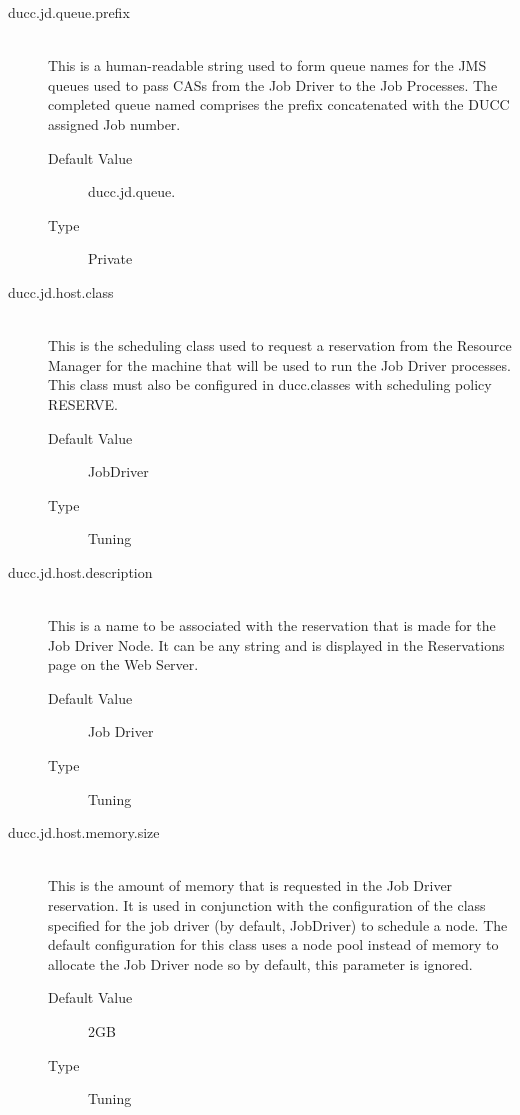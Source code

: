 \begin{description}
        \item[ducc.jd.queue.prefix] \hfill \\
          This is a human-readable string used to form queue names for the JMS
          queues used to pass CASs from the Job Driver to the Job Processes.
          The completed queue named comprises the prefix concatenated with the
          DUCC assigned Job number.
          \begin{description}
            \item[Default Value] ducc.jd.queue. 
            \item[Type] Private 
          \end{description}
          
        \item[ducc.jd.host.class] \hfill \\
          This is the scheduling class used to request a reservation from the Resource Manager for 
          the machine that will be used to run the Job Driver processes. This class must also be 
          configured in ducc.classes with scheduling policy RESERVE. 
          \begin{description}
            \item[Default Value] JobDriver 
            \item[Type] Tuning 
          \end{description}
          
        \item[ducc.jd.host.description] \hfill \\
          This is a name to be associated with the reservation that is made for the Job Driver Node. 
          It can be any string and is displayed in the Reservations page on the Web Server. 
          \begin{description}
            \item[Default Value] Job Driver 
            \item[Type] Tuning 
          \end{description}

        \item[ducc.jd.host.memory.size] \hfill \\
          This is the amount of memory that is requested in the Job Driver reservation. It is used 
          in conjunction with the configuration of the class specified for the job driver (by default, 
          JobDriver) to schedule a node. The default configuration for this class uses a node pool 
          instead of memory to allocate the Job Driver node so by default, this parameter is ignored. 
          \begin{description}
            \item[Default Value] 2GB 
            \item[Type] Tuning 
          \end{description}
          


\end{description}
